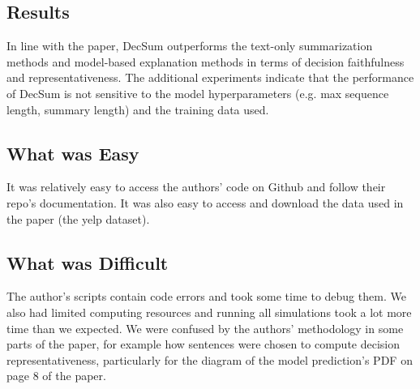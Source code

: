 \documentclass{article}
\begin{document}
\subsection*{Results}
In line with the paper, DecSum outperforms the text-only summarization methods and model-based explanation methods in terms of decision faithfulness and representativeness. The additional experiments
indicate that the performance of DecSum is not sensitive to the model hyperparameters (e.g. max sequence length, summary length) and the training data used.

\subsection*{What was Easy}
It was relatively easy to access the authors' code on Github and follow their repo's documentation. It was also easy to access and download the data used in the paper (the yelp dataset).

\subsection*{What was Difficult}
The author's scripts contain code errors and took some time to debug them. We also had limited computing resources and running all simulations took a lot more time than we expected. We were confused
by the authors' methodology in some parts of the paper, for example how sentences were chosen to compute decision representativeness, particularly for the diagram of the model prediction's PDF
on page 8 of the paper.
\end{document}
